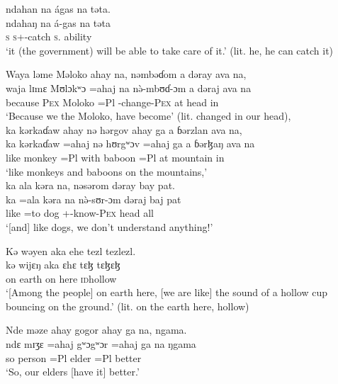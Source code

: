 \medskip
 ndahan  na  ágas  na  təta.\\
 \gll ndahaŋ   na  á-gas        na   təta\\
 \textsc{s}    {\PSP}  \textsc{s}+{\IFV}-catch  \textsc{s}.{\DO}  ability\\
 \glt ‘it (the government) will be able to take care of it.’  (lit. he, he can catch it)
 \z

\ea Waya  ləme  Məloko  ahay  na,  nəmbəɗom  a  dəray  ava  na,     \\
 \gll waja  lɪmɛ  Mʊlɔkʷɔ  =ahaj    na  n\`ə-mbʊɗ-ɔm      a  dəraj  ava  na\\
 because    \textsc{Pex}     Moloko    =Pl  {\PSP} {\PFV}-change-\textsc{Pex}  at   head  in    {\PSP}\\
 \glt ‘Because we the Moloko, have become' (lit. changed in our head),  \\
 
 \medskip
 ka  kərkaɗaw  ahay  nə  hərgov  ahay  ga  a  ɓərzlan  ava  na,\\
 \gll ka    kərkaɗaw    =ahaj  nə   hʊrgʷɔv  =ahaj ga a ɓərɮaŋ     ava    na\\
 like  monkey    =Pl        with  baboon    =Pl  {\ADJ}  at  mountain    in    {\PSP}\\
 \glt ‘like monkeys and baboons on the mountains,’\\
 
 \medskip
  ka ala  kəra  na,  nəsərom  dəray  bay  pat.    \\ 
 \gll ka   =ala   kəra      na  n\`ə-sʊr-ɔm     dəraj   baj   pat \\
 like  =to  dog   {\PSP} +{\PFV}-know-\textsc{Pex}  head  {\NEG}  all\\
 \glt ‘[and] like dogs, we don’t understand anything!’ 
 \z

\ea Kə  wəyen  aka  ehe  tezl tezlezl.\\
 \gll kə   wijɛŋ   aka   ɛhɛ  {tɛɮ tɛɮɛɮ}\\
 on  earth  on  here  \textsc{id}hollow\\
 \glt ‘[Among the people] on earth here, [we are like] the sound of a hollow cup bouncing on the ground.’ (lit. on the earth here, hollow)
 \z

\ea Nde  məze  ahay  gogor  ahay  ga  na,  ngama.\\
 \gll ndɛ  mɪʒɛ  =ahaj  gʷɔgʷɔr   =ahaj ga  na   ŋgama\\
 so    person     =Pl  elder   =Pl   {\ADJ}   {\PSP}  better\\
\glt  ‘So, our elders [have it] better.’ 
 \z

